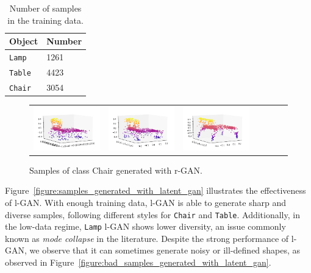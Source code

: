 \documentclass[12pt]{article}
\begin{document}
    \begin{table}[H]
        \centering
        \begin{tabular}{ll}
            \toprule
            Object       & Number \\
            \midrule
            \verb|Lamp|  & 1261   \\
            \verb|Table| & 4423   \\
            \verb|Chair| & 3054   \\
            \bottomrule
        \end{tabular}
        \caption{Number of samples in the training data.}
        \label{table:statistics}
    \end{table}

    \begin{figure}
        \centering
        \begin{tabular}{lllllll}
            \includegraphics[width = 30mm]{chair_raw_gen_1} &
            \includegraphics[width = 30mm]{chair_raw_gen_2} &
            \includegraphics[width = 30mm]{chair_raw_gen_3} \\
        \end{tabular}
        \caption{Samples of class Chair generated with r-GAN.}
        \label{figure:samples_generated_with_raw_gan}
    \end{figure}

    Figure~\ref{figure:samples_generated_with_latent_gan} illustrates the effectiveness of l-GAN. With enough training data, l-GAN is able to generate sharp and diverse samples, following different styles for \verb|Chair| and \verb|Table|. Additionally, in the low-data regime, \verb|Lamp| l-GAN shows lower diversity, an issue commonly known as \textit{mode collapse} in the literature. Despite the strong performance of l-GAN, we observe that it can sometimes generate noisy or ill-defined shapes, as observed in Figure~\ref{figure:bad_samples_generated_with_latent_gan}.
\end{document}
